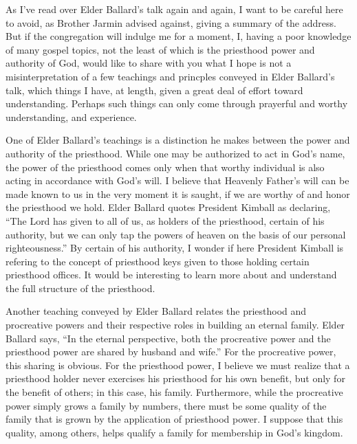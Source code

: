 \documentclass[12pt]{article}
\begin{document}
As I've read over Elder Ballard's talk again and again, I want to be careful here to
avoid, as Brother Jarmin advised against, giving a summary of the address.  But if the
congregation will indulge me for a moment, I, having a
poor knowledge of many gospel topics, not the least of which is the priesthood
power and authority of God, would like to share with you what I hope is not
a misinterpretation of a few teachings and princples conveyed in Elder Ballard's talk,
which things I have, at length, given a great deal of effort toward understanding.
Perhaps such things can only come through prayerful and worthy understanding,
and experience.

One of Elder Ballard's teachings is a distinction he makes between the power and
authority of the priesthood.  While one may be authorized to act in God's name,
the power of the priesthood comes only when that worthy individual is also acting in
accordance with God's will.  I believe that Heavenly Father's will can be made known
to us in the very moment it is saught, if we are worthy of and honor the priesthood we hold.
Elder Ballard quotes President Kimball as declaring, ``The Lord has given to all of us, as holders of
the priesthood, certain of his authority, but we can only tap the powers of heaven on the basis
of our personal righteousness.''  By certain of his authority, I wonder if here President Kimball
is refering to the concept of priesthood keys given to those holding certain priesthood offices.
It would be interesting to learn more about and understand the full structure of the priesthood.

Another teaching conveyed by Elder Ballard relates the priesthood and procreative powers
and their respective roles in building an eternal family.  Elder Ballard says, ``In the
eternal perspective, both the procreative power and the priesthood power are shared by husband
and wife.''  
For the procreative power, this sharing is obvious.  For the priesthood power, I believe
we must realize that a priesthood holder never exercises his priesthood for his own benefit,
but only for the benefit of others; in this case, his family.  Furthermore, while the procreative
power simply grows a family by numbers, there must be some quality of the family that is grown
by the application of priesthood power.  I suppose that this quality, among others, helps qualify a family
for membership in God's kingdom.

\end{document}
